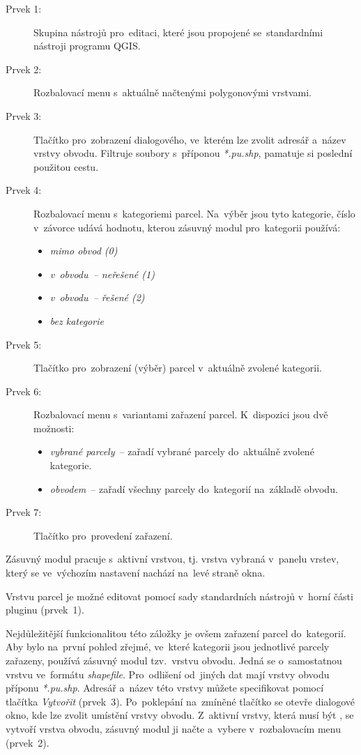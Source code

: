 \begin{description}
	\item[Prvek 1:] Skupina nástrojů pro~editaci, které jsou propojené se~standardními nástroji programu QGIS.
	\item[Prvek 2:] Rozbalovací menu s~aktuálně načtenými polygonovými vrstvami.
	\item[Prvek 3:] Tlačítko pro~zobrazení dialogového, ve~kterém lze zvolit adresář a~název vrstvy obvodu. Filtruje soubory s~příponou \textit{*.pu.shp}, pamatuje si poslední použitou cestu.
	\item[Prvek 4:] Rozbalovací menu s~kategoriemi parcel. Na~výběr jsou tyto kategorie, číslo v~závorce udává hodnotu, kterou zásuvný modul pro~kategorii používá:
	\begin{itemize}[leftmargin=1.5cm, noitemsep]
		\item \textit{mimo obvod (0)}
		\item \textit{v~obvodu~– neřešené (1)}
		\item \textit{v~obvodu~– řešené (2)}
		\item \textit{bez kategorie}
	\end{itemize}
	\item[Prvek 5:] Tlačítko pro~zobrazení (výběr) parcel v~aktuálně zvolené kategorii.
	\item[Prvek 6:] Rozbalovací menu s~variantami zařazení parcel. K~dispozici jsou dvě možnosti:
	\begin{itemize}[leftmargin=1.5cm, noitemsep]
		\item \textit{vybrané parcely}~– zařadí vybrané parcely do~aktuálně zvolené kategorie.
		\item \textit{obvodem}~– zařadí všechny parcely do~kategorií na~základě obvodu.
	\end{itemize}
	\item[Prvek 7:] Tlačítko pro~provedení zařazení.
\end{description}

Zásuvný modul pracuje s~aktivní vrstvou, tj. vrstva vybraná v~panelu vrstev, který se ve~výchozím nastavení nachází na~levé straně okna.

Vrstvu parcel je možné editovat pomocí sady standardních nástrojů v~horní části pluginu (prvek~1).

Nejdůležitější funkcionalitou této záložky je ovšem zařazení parcel do~kategorií. Aby bylo na~první pohled zřejmé, ve~které kategorii jsou jednotlivé parcely zařazeny, používá zásuvný modul tzv.~vrstvu obvodu. Jedná se o~samostatnou vrstvu ve~formátu \textit{shapefile}. Pro~odlišení od~jiných dat mají vrstvy obvodu příponu \textit{*.pu.shp}. Adresář a~název této vrstvy můžete specifikovat pomocí tlačítka \textit{Vytvořit} (prvek~3). Po~poklepání na~zmíněné tlačítko se otevře dialogové okno, kde lze zvolit umístění vrstvy obvodu. Z~aktivní vrstvy, která musí být , se vytvoří vrstva obvodu, zásuvný modul ji načte a~vybere v~rozbalovacím menu (prvek~2).


